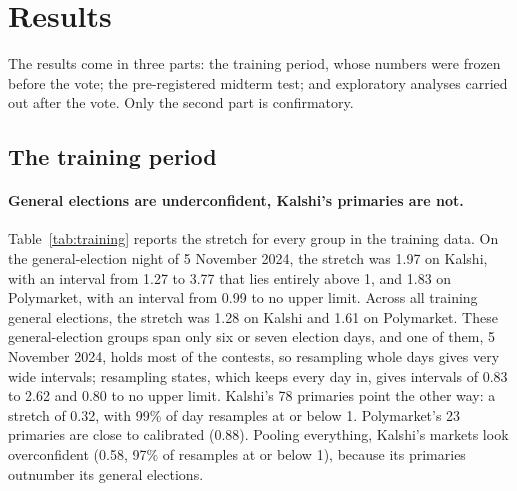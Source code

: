 \section{Results}\label{sec:results}

The results come in three parts: the training period, whose numbers were frozen before the vote; the pre-registered
midterm test; and exploratory analyses carried out after the vote. Only the second part is confirmatory.

\subsection{The training period}

\paragraph{General elections are underconfident, Kalshi's primaries are not.}
Table~\ref{tab:training} reports the stretch for every group in the training data. On the general-election night of
5 November 2024, the stretch was 1.97 on Kalshi, with an interval from 1.27 to 3.77 that lies entirely above 1, and 1.83
on Polymarket, with an interval from 0.99 to no upper limit. Across all training general elections, the stretch was 1.28
on Kalshi and 1.61 on Polymarket. These general-election groups span only six or seven election days, and one of them,
5 November 2024, holds most of the contests, so resampling whole days gives very wide intervals; resampling states,
which keeps every day in, gives intervals of 0.83 to 2.62 and 0.80 to no upper limit. Kalshi's 78 primaries point the
other way: a stretch of 0.32, with 99\% of day resamples at or below 1. Polymarket's 23 primaries are close to
calibrated (0.88). Pooling everything, Kalshi's markets look overconfident (0.58, 97\% of resamples at or below 1),
because its primaries outnumber its general elections.

